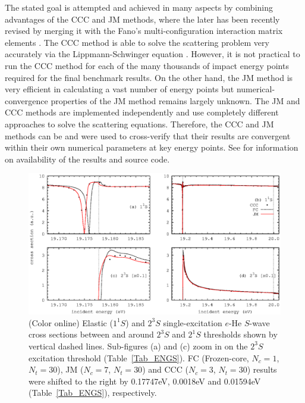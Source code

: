 \documentclass[aip
, pra
, showpacs
, aps
, twocolumn
, groupedaddress
, floatfix
]{revtex4}
\begin{document}
The stated goal is attempted and achieved in many aspects by combining advantages of the CCC and JM methods,
where the later has been recently revised \cite{KFB11} by merging it with the Fano's multi-configuration interaction matrix elements \cite{Fano65}.
The CCC method is able to solve the scattering problem very accurately via the Lippmann-Schwinger equation \cite{BS92p6995}.
However, it is not practical to run the CCC method for each of the many thousands of impact energy points required for the final benchmark results.
On the other hand, the JM method is very efficient \cite{HY74p1201,BR76p1491} in calculating a vast number of energy points
but numerical-convergence properties of the JM method remains largely unknown.
The JM and CCC methods are implemented independently and use completely different approaches to solve the scattering equations.
Therefore, the CCC and JM methods can be and were used to cross-verify that their results are convergent within their own numerical parameters at key energy points.
See \cite{JMatrixWebsite} for information on availability of the results and source code.


\begin{figure}[htb]
\includegraphics[scale=1]{fig1.ps}
\caption{(Color online) Elastic ($1^1S$) and
$2^3S$ single-excitation $e$-He $S$-wave cross sections between and around $2^3S$ and $2^1S$ thresholds shown by vertical dashed lines.
Sub-figures (a) and (c) zoom in on the $2^3S$ excitation threshold (Table~\ref{Tab_ENGS}).
FC (Frozen-core, $N_c=1$, $N_t=30$), JM ($N_c=7$, $N_t=30$) and CCC ($N_c=3$, $N_t=30$) results  were shifted to the right by 0.17747eV, 0.0018eV
and 0.01594eV (Table~\ref{Tab_ENGS}), respectively.
}
\label{Fig_1}
\end{figure}
\end{document}

